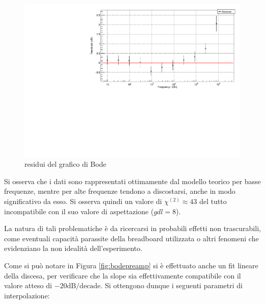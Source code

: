 \documentclass{article}
\begin{document}

\begin{center}
    \begin{figure}[H]
    \centering
    \includegraphics[scale=0.4, angle=0]{bodepreampresidui.pdf}
    \caption{residui del grafico di Bode}
    \label{fig:bodepreamp_res}
    \end{figure}
\end{center}

Si osserva che i dati sono rappresentati ottimamente dal modello teorico per basse
frequenze, mentre per alte frequenze tendono a discostarsi, anche in modo 
significativo da esso. Si osserva quindi un valore di $\chi^{(2)} \approx 43$ del tutto 
incompatibile con il suo valore di aspettazione ($gdl = 8$). 

La natura di tali problematiche è da ricercarsi in probabili effetti
non trascurabili, come eventuali capacità parassite della breadboard utilizzata o
altri fenomeni che evidenziano la non idealità dell'esperimento.

Come si può notare in Figura \ref{fig:bodepreamp} si è effettuato anche un
fit lineare della discesa, per verificare che la slope sia effettivamente
compatibile con il valore atteso di $-20 \text{dB}/\text{decade}$. Si ottengono
dunque i seguenti parametri di interpolazione:
\end{document}
